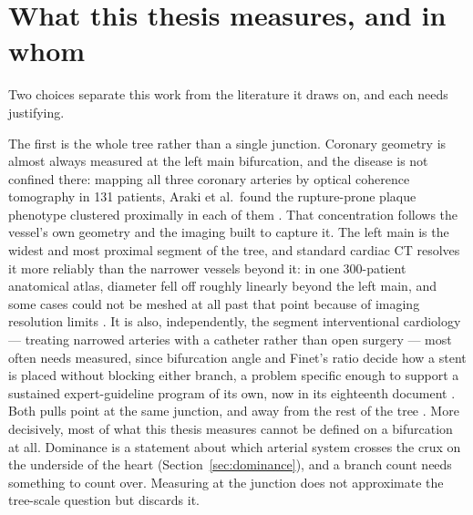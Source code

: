 
\section{What this thesis measures, and in whom}
\label{sec:design}

Two choices separate this work from the literature it draws on, and each needs justifying.

The first is the whole tree rather than a single junction.
Coronary geometry is almost always measured at the left main bifurcation, and the disease is not
confined there: mapping all three coronary arteries by optical coherence tomography in 131 patients,
Araki et al.\ found the rupture-prone plaque phenotype clustered proximally in each of them
\cite{araki2020plaques}.
That concentration follows the vessel's own geometry and the imaging built to capture it.
The left main is the widest and most proximal segment of the tree, and standard cardiac CT
resolves it more reliably than the narrower vessels beyond it: in one 300-patient anatomical
atlas, diameter fell off roughly linearly beyond the left main, and some cases could not be
meshed at all past that point because of imaging resolution limits \cite{medranogracia2016atlas}.
It is also, independently, the segment interventional cardiology --- treating narrowed arteries
with a catheter rather than open surgery --- most often needs measured, since bifurcation angle
and Finet's ratio decide how a stent is placed without blocking either branch, a problem specific
enough to support a sustained expert-guideline program of its own, now in its eighteenth document
\cite{burzotta2024ebc}.
Both pulls point at the same junction, and away from the rest of the tree \cite{shen2026geometry}.
More decisively, most of what this thesis measures cannot be defined on a bifurcation at all.
Dominance is a statement about which arterial system crosses the crux on the underside of the heart
(Section~\ref{sec:dominance}), and a branch count needs something to count over.
Measuring at the junction does not approximate the tree-scale question but discards it.

